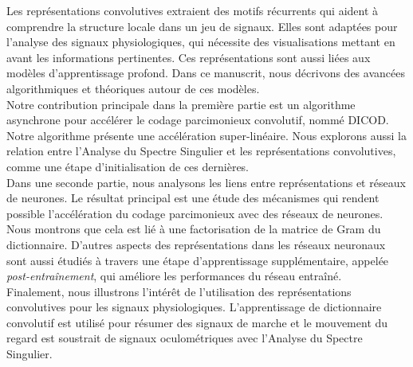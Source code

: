 \documentclass[../thesis.tex]{subfiles}
\begin{document}
%
%
%
%
Les représentations convolutives extraient des motifs récurrents qui aident à comprendre la structure locale dans un jeu de signaux. Elles sont adaptées pour l'analyse des signaux physiologiques, qui nécessite des visualisations mettant en avant les informations pertinentes. Ces représentations sont aussi liées aux modèles d'apprentissage profond. Dans ce manuscrit, nous décrivons des avancées algorithmiques et théoriques autour de ces modèles.\\[\parskipabstract]
%
%
Notre contribution principale dans la première partie est un algorithme asynchrone pour accélérer le codage parcimonieux convolutif, nommé DICOD. Notre algorithme présente une accélération super-linéaire. Nous explorons aussi la relation entre  l'Analyse du Spectre Singulier et les représentations convolutives, comme une étape d'initialisation de ces dernières.\\[\parskipabstract]
%
%
Dans une seconde partie, nous analysons les liens entre représentations et réseaux de neurones. Le résultat principal est une étude des mécanismes qui rendent possible l'accélération du codage parcimonieux avec des réseaux de neurones. Nous montrons que cela est lié à une factorisation de la matrice de Gram du dictionnaire. D'autres aspects des représentations dans les réseaux neuronaux sont aussi étudiés à travers une étape d'apprentissage supplémentaire, appelée \emph{post-entraînement}, qui améliore les performances du réseau entraîné.\\[\parskipabstract]
%
%
Finalement, nous illustrons l'intérêt de l'utilisation des représentations convolutives pour les signaux physiologiques. L'apprentissage de dictionnaire convolutif est utilisé pour résumer des signaux de marche et le mouvement du regard est soustrait de signaux oculométriques avec l'Analyse du Spectre Singulier.
\biblio{}
\end{document}
